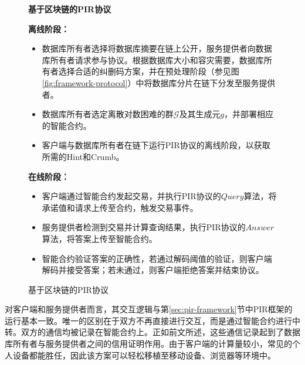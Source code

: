\begin{figure}
    \begin{mdframed}
        \centering
        \textbf{基于区块链的PIR协议}

        \raggedright
        \textbf{离线阶段：}
        \begin{itemize}
            \item 数据库所有者选择将数据库摘要在链上公开，服务提供者向数据库所有者请求参与协议。根据数据库大小和容灾需要，数据库所有者选择合适的纠删码方案，并在预处理阶段（参见图\ref{fig:framework-protocol}）中将数据库分片在链下分发至服务提供者。
            \item 数据库所有者选定离散对数困难的群$\mathcal{G}$及其生成元$g$，并部署相应的智能合约。
            \item 客户端与数据库所有者在链下运行PIR协议的离线阶段，以获取所需的Hint和Crumb。
        \end{itemize}
        \textbf{在线阶段：}
        \begin{itemize}
            \item 客户端通过智能合约发起交易，并执行PIR协议的$Query$算法，将承诺值和请求上传至合约，触发交易事件。
            \item 服务提供者检测到交易并计算查询结果，执行PIR协议的$Answer$算法，将答案上传至智能合约。
            \item 智能合约验证答案的正确性，若通过解码阈值的验证，则客户端解码并接受答案；若未通过，则客户端拒绝答案并结束协议。
        \end{itemize}
    \end{mdframed}
    \caption{基于区块链的PIR协议}
    \label{fig:blockchain-scheme}
\end{figure}

对客户端和服务提供者而言，其交互逻辑与第\ref{sec:pir-framework}节中PIR框架的运行基本一致。唯一的区别在于双方不再直接进行交互，而是通过智能合约进行中转。双方的通信均被记录在智能合约上。正如前文所述，这些通信记录起到了数据库所有者与服务提供者之间的信用证明作用。由于客户端的计算量较小，常见的个人设备都能胜任，因此该方案可以轻松移植至移动设备、浏览器等环境中。

